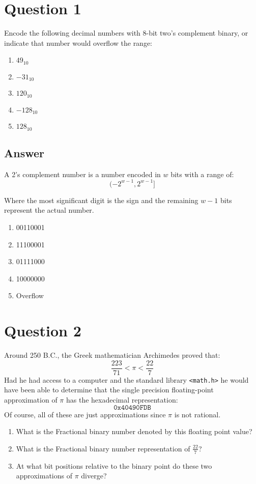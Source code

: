 \documentclass[12pt]{book}
\title{\coursetitle\linebreak\lecturename}
\author{\\Cain Susko\\ 
           \\ \\ \\
      Queen's University 
    \\School of Computing\\}
\begin{document}
\begin{titlepage}
        \maketitle
\end{titlepage}


\section*{Question 1}
Encode the following decimal numbers with 8-bit two’s complement
binary, or indicate that number would overflow the range:
\begin{enumerate}
        \item  $49_{10}$
        \item  $-31_{10}$
        \item  $120_{10}$
        \item  $-128_{10}$
        \item  $128_{10}$
\end{enumerate}

\subsection*{Answer}
A 2's complement number is a number encoded in $w$ bits with a range of: 
\[(-2^{w-1}, 2^{w-1}]\]

Where the most significant digit is the sign and the remaining $w-1$ bits represent the actual number.  
\begin{enumerate}
        \item 00110001
        \item 11100001
        \item 01111000
        \item 10000000
        \item Overflow 
\end{enumerate}
\pagebreak


\section*{Question 2}
Around 250 B.C., the Greek mathematician Archimedes proved that:
\[\frac{223}{71}<\pi<\frac{22}{7}\]
Had he had access to a computer and the standard library \texttt{<math.h>} he would have been able to 
        determine that the single precision floating-point approximation of $\pi$ has the hexadecimal
        representation:
        \[\texttt{0x40490FDB}\]
Of course, all of these are just approximations since $\pi$ is not rational.
\begin{enumerate}
        \item What is the Fractional binary number denoted by this floating point value?
        \item What is the Fractional binary number representation of $\frac{22}{7}$?
        \item At what bit positions relative to the binary point do these two approximations of $\pi$ diverge?
\end{enumerate}
\end{document}
